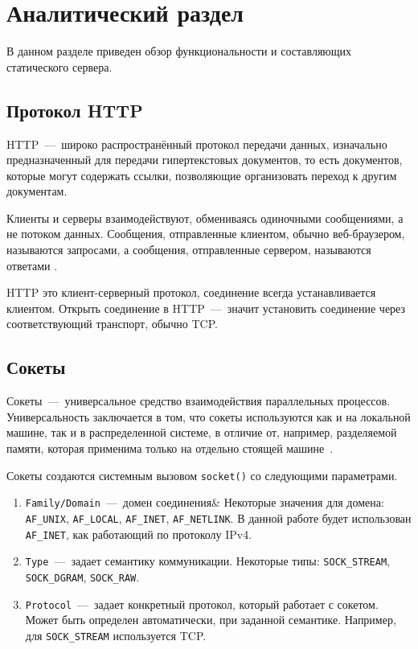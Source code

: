 \chapter{Аналитический раздел}

В данном разделе приведен обзор функциональности и составляющих статического сервера.

\section{Протокол HTTP}
HTTP~---~широко распространённый протокол передачи данных, изначально
предназначенный для передачи гипертекстовых документов, то есть документов, которые могут содержать ссылки, позволяющие организовать переход к другим документам.

Клиенты и серверы взаимодействуют, обмениваясь одиночными сообщениями, а не потоком данных. Сообщения, отправленные клиентом, обычно веб-браузером, называются запросами, а сообщения, отправленные сервером, называются ответами \cite{http}. 

HTTP это клиент-серверный протокол, соединение всегда устанавливается
клиентом. Открыть соединение в HTTP~---~значит установить соединение через соответствующий транспорт, обычно TCP.

\section{Сокеты}
Сокеты~---~универсальное средство взаимодействия параллельных процессов. Универсальность заключается в том, что сокеты используются как и на локальной машине, так и в распределенной системе, в отличие от, например, разделяемой памяти, которая применима только на отдельно стоящей машине~\cite{ryaznu}.

Сокеты создаются системным вызовом \texttt{socket()} со следующими параметрами.

\begin{enumerate}[label=\arabic*)]
	\item \texttt{Family/Domain}~---~домен соединения& Некоторые значения для домена: \texttt{AF\_UNIX}, \texttt{AF\_LOCAL}, \texttt{AF\_INET}, \texttt{AF\_NETLINK}. В данной работе будет использован \texttt{AF\_INET}, как работающий по протоколу IPv4.
	\item \texttt{Type}~---~задает семантику коммуникации. Некоторые типы: \texttt{SOCK\_STREAM}, \texttt{SOCK\_DGRAM}, \texttt{SOCK\_RAW}.
		\item \texttt{Protocol}~---~задает конкретный протокол, который работает с сокетом. Может быть определен автоматически, при заданной семантике. Например, для \texttt{SOCK\_STREAM} используется TCP.
\end{enumerate}

